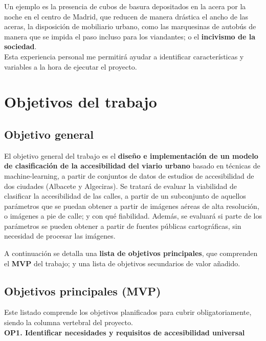 Un ejemplo es la presencia de cubos de basura depositados en la acera por la noche en el centro de Madrid, que reducen de manera drástica el ancho de las aceras, la disposición de mobiliario urbano, como las marquesinas de autobús de manera que se impida el paso incluso para los viandantes; o el \textbf{incivismo de la sociedad}.
\\

Esta experiencia personal me permitirá ayudar a identificar características y variables a la hora de ejecutar el proyecto.
\\

\section{Objetivos del trabajo}
\label{sec:objetivos}

\subsection{Objetivo general}

El objetivo general del trabajo es el \textbf{diseño e implementación de un modelo de clasificación de la accesibilidad del viario urbano} basado en técnicas de \gls{machine-learning}, a partir de conjuntos de datos de estudios de accesibilidad de dos ciudades (Albacete y Algeciras).
Se tratará de evaluar la viabilidad de clasificar la accesibilidad de las calles, a partir de un subconjunto de aquellos parámetros que se puedan obtener a partir de imágenes aéreas de alta resolución, o imágenes a pie de calle; y con qué fiabilidad.
Además, se evaluará si parte de los parámetros se pueden obtener a partir de fuentes públicas cartográficas, sin necesidad de procesar las imágenes.

A continuación se detalla una \textbf{lista de objetivos principales}, que comprenden el \textbf{\gls{MVP}} del trabajo; y una lista de objetivos secundarios de valor añadido.

\subsection{Objetivos principales (MVP)}

Este listado comprende los objetivos planificados para cubrir obligatoriamente, siendo la columna vertebral del proyecto.
\\

\textbf{OP1. Identificar necesidades y requisitos de accesibilidad universal}


